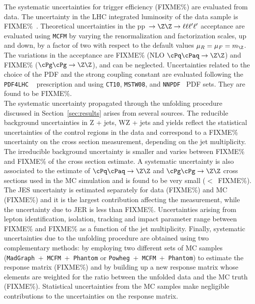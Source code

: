 \label{sec:systunc}
The systematic uncertainties for trigger efficiency (FIXME\%) are evaluated from data. The uncertainty in the LHC integrated luminosity of the data sample is FIXME\%~\cite{CMS-PAS-LUM-13-001}. Theoretical uncertainties in the pp~$\to \Z\Z \to \ell\ell\ell'\ell'$ acceptance are evaluated using \texttt{MCFM}  by varying the renormalization and factorization scales, up and down, by a factor of two with respect to the default values $\mu_R = \mu_F = m_\Z$. The variations in the acceptance are FIXME\% (NLO $\cPq\cPaq \to \Z\Z$) and FIXME\% ($\cPg\cPg \to \Z\Z$), and can be neglected. Uncertainties related to the choice of the PDF and the strong coupling constant are evaluated following the \texttt{PDF4LHC} ~\cite{PDF4LHCRec, PDF4LHCRep} prescription and using \texttt{CT10},  \texttt{MSTW08}, and  \texttt{NNPDF}~\cite{NNPDF} PDF sets. They are found to be FIXME\%.\\
The systematic uncertainty propagated through the unfolding procedure discussed in Section~\ref{sec:results} arises from several sources. The reducible background uncertainties in Z + jets, WZ + jets and \ttbar yields reflect the statistical uncertainties of the control regions in the data and correspond to a FIXME\%  uncertainty on the cross section measurement, depending on the jet multiplicity. The irreducible background uncertainty is smaller and varies between FIXME\% and FIXME\% of the cross section estimate. A systematic uncertainty is also associated to the estimate of  $\cPq\cPaq \to \Z\Z$ and $\cPg\cPg \to \Z\Z$ cross sections used in the MC simulation and is found to be very small ($<$~FIXME\%). The JES uncertainty is estimated separately for data (FIXME\%) and MC (FIXME\%) and it is the largest contribution affecting the measurement, while the uncertainty due to JER is less than FIXME\%. Uncertainties arising from lepton identification, isolation, tracking and impact parameter range between FIXME\% and FIXME\% as a function of the jet multiplicity. Finally, systematic uncertainties due to the unfolding procedure are obtained using two complementary methods: by employing two different sets of MC samples (\texttt{MadGraph}~+~\texttt{MCFM}~+~\texttt{Phantom} or \texttt{Powheg}~+~\texttt{MCFM}~+~\texttt{Phantom}) to estimate the response matrix (FIXME\%) and by building up a new response matrix whose elements are weighted for the ratio between the unfolded data and the MC truth (FIXME\%). Statistical uncertainties from the MC samples make negligible contributions to the uncertainties on the response matrix.
